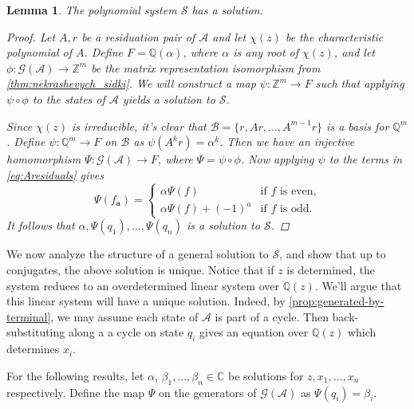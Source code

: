 \documentclass[12pt, letterpaper]{article}
\newcommand{\Z}{\mathbb Z}
\newcommand{\Q}{\mathbb Q}
\newcommand{\C}{\mathbb C}
\newcommand{\A}{\mathcal A}
\newcommand{\ch}[1]{\mathbf{#1}}
\newcommand{\res}[2]{{{#1}_{\ch{#2}}}}
\renewcommand{\S}{\mathcal S}
\newcommand{\gp}{\mathcal G}
\newtheorem{lemma}[thm]{Lemma}
\begin{document}
\begin{lemma}\label{lemma:solution_exists}
    The polynomial system $\S$ has a solution.
    \begin{proof}
        Let $A, r$ be a residuation pair of $\A$ and let $\chi(z)$ be the
        characteristic polynomial of $A$. Define $F = \Q(\alpha)$, where
        $\alpha$ is any root of $\chi(z)$, and let $\phi : \gp(\A) \rightarrow
        \Z^m$ be the matrix representation isomorphism from
        \cref{thm:nekrashevych_sidki}. We will construct a map $\psi: \Z^m
        \rightarrow F$ such that applying $\psi \circ \phi$ to the states of
        $\A$ yields a solution to $\S$.

        Since $\chi(z)$ is irreducible, it's clear that $\mathcal B = \{r, Ar,
        \ldots, A^{m-1}r\}$ is a basis for $\Q^m$.  Define $\psi : \Q^m
        \rightarrow F$ on $\mathcal B$ as $\psi(A^k r) = \alpha^k$.  Then we
        have an injective homomorphism $\Psi: \gp(\A) \rightarrow F$, where
        $\Psi = \psi \circ \phi$.  Now applying $\psi$ to the terms in
        \cref{eq:Aresiduals} gives
        \begin{equation}
            \label{eq:aresiduals} \Psi(\res{f}{a}) = \begin{cases}
                \alpha \Psi(f) & \text{if $f$ is even,}\\
                \alpha \Psi(f) + (-1)^a & \text{if $f$ is odd.}
            \end{cases}
        \end{equation}
        It follows that $\alpha, \Psi(q_1), \ldots, \Psi(q_n)$ is a solution to
        $\S$.
    \end{proof}
\end{lemma}


We now analyze the structure of a general solution to $\S$, and show that up to
conjugates, the above solution is unique.  Notice that if $z$ is determined,
the system reduces to an overdetermined linear system over $\Q(z)$. We'll argue
that this linear system will have a unique solution. Indeed, by
\cref{prop:generated-by-terminal}, we may assume each state of $\A$ is part of
a cycle. Then back-substituting along a a cycle on state $q_i$ gives an
equation over $\Q(z)$ which determines $x_i$.

For the following results, let $\alpha$, $\beta_1, \ldots, \beta_n \in \C$ be
solutions for $z, x_1, \ldots, x_n$ respectively. Define the map $\Psi$ on the
generators of $\gp(\A)$ as $\Psi(q_i) = \beta_i$.
\end{document}
